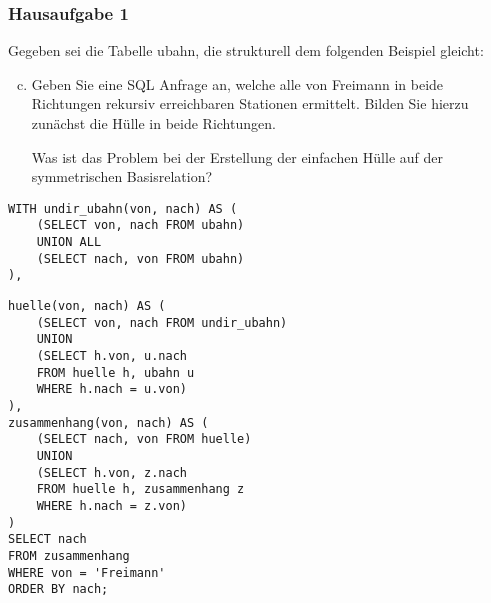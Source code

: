 \begin{frame}[fragile]
\frametitle{Hausaufgabe 1}
\vspace{0.25cm}

\begin{multicols}{2}
	Gegeben sei die Tabelle ubahn, die strukturell dem folgenden Beispiel gleicht:
	\begin{enumerate}[a)]
		\setcounter{enumi}{2}
		\item Geben Sie eine SQL Anfrage an, welche alle von Freimann
		      in beide Richtungen rekursiv erreichbaren Stationen ermittelt.
		      Bilden Sie hierzu zunächst die Hülle in beide Richtungen.

		      Was ist das Problem bei der Erstellung der einfachen Hülle auf der symmetrischen Basisrelation?
	\end{enumerate}
	\begin{verbatim}
WITH undir_ubahn(von, nach) AS (
	(SELECT von, nach FROM ubahn)
	UNION ALL
	(SELECT nach, von FROM ubahn)
),
	\end{verbatim}
	\vfill\columnbreak

	\begin{verbatim}
huelle(von, nach) AS (
	(SELECT von, nach FROM undir_ubahn)
	UNION
	(SELECT h.von, u.nach
	FROM huelle h, ubahn u
	WHERE h.nach = u.von)
),
zusammenhang(von, nach) AS (
	(SELECT nach, von FROM huelle)
	UNION
	(SELECT h.von, z.nach 
	FROM huelle h, zusammenhang z
	WHERE h.nach = z.von)
)
SELECT nach
FROM zusammenhang
WHERE von = 'Freimann'
ORDER BY nach;
	\end{verbatim}
\end{multicols}
\end{frame}
